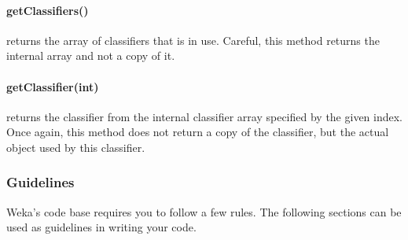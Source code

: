 \paragraph{getClassifiers()} returns the array of classifiers that is in use.
Careful, this method returns the internal array and not a copy of it.

\paragraph{getClassifier(int)} returns the classifier from the internal
classifier array specified by the given index. Once again, this method does not
return a copy of the classifier, but the actual object used by this classifier.

\newpage
\subsubsection{Guidelines}
Weka's code base requires you to follow a few rules. The following sections can
be used as guidelines in writing your code.

